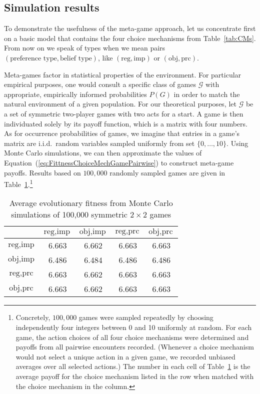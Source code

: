 \documentclass[fleqn,reqno,11pt]{article}
\begin{document}
\subsection{Simulation results}
\label{sec:simulation-results}

To demonstrate the usefulness of the meta-game approach, let us concentrate first on a basic
model that contains the four choice mechanisms from Table~\ref{tab:CMs}. From now on we speak
of types when we mean pairs $(\text{preference type}, \text{belief type})$, like $(\text{reg}, \text{imp})$ or $(\text{obj}, \text{prc})$.

Meta-games factor in statistical properties of the environment. For particular empirical
purposes, one would consult a specific class of games $\mathcal{G}$ with appropriate,
empirically informed probabilities $P(G)$ in order to match the natural environment of a given
population. 
For our theoretical purposes, let $\mathcal{G}$ be a set of
symmetric two-player games with two acts for a start. A game is then individuated solely by its payoff
function, which is a matrix with four numbers. As for occurrence probabilities of
games, we imagine that entries in a game's matrix are i.i.d.~random variables sampled
uniformly from set $ \lbrace 0, \dots, 10 \rbrace$.  Using Monte Carlo simulations, we can then
approximate the values of Equation~(\ref{eq:FittnessChoiceMechGamePairwise})
to construct meta-game payoffs. Results based on $100,000$ randomly sampled games are given in
Table~\ref{tab:ExpectedFitness_4Types}.\footnote{Concretely, $100,000$ games were sampled
  repeatedly by choosing independently four integers between 0 and 10 uniformly at random. For
  each game, the action choices of all four choice mechanisms were determined and payoffs from
  all pairwise encounters recorded. (Whenever a choice mechanism would not select a unique
  action in a given game, we recorded unbiased averages over all selected actions.)  The number
  in each cell of Table~\ref{tab:ExpectedFitness_4Types} is the average payoff for the choice
  mechanism listed in the row when matched with the choice mechanism in the column.}



\begin{table}[t]
\centering
\begin{tabular}{ccccc}
  \toprule
 & $\text{reg}, \text{imp}$ 
 & $\text{obj}, \text{imp}$ 
 & $\text{reg}, \text{prc}$ 
 & $\text{obj}, \text{prc}$ \\ 
  \midrule
  $\text{reg}, \text{imp}$ & 6.663 & 6.662 & 6.663 & 6.663 \\ 
  $\text{obj}, \text{imp}$ & 6.486 & 6.484 & 6.486 & 6.486 \\ 
  $\text{reg}, \text{prc}$ & 6.663 & 6.662 & 6.663 & 6.663 \\  
  $\text{obj}, \text{prc}$ & 6.663 & 6.662 & 6.663 & 6.663 \\ 
   \bottomrule
\end{tabular}                    
\caption{Average evolutionary fitness from Monte Carlo simulations of 100,000 symmetric $2 \times 2$ games}
\label{tab:ExpectedFitness_4Types}
\end{table}
\end{document}
